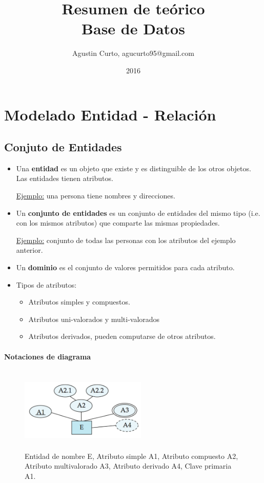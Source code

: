 \documentclass[12pt,a4paper]{report}
\author{Agustin Curto, agucurto95@gmail.com}
\title{Resumen de teórico \\ Base de Datos}
\date{2016}
\begin{document}
\maketitle
\tableofcontents

\chapter{Modelado Entidad - Relación}
	\section{Conjuto de Entidades}
		\begin{itemize}
			\item Una \textbf{entidad} es un objeto que existe y es distinguible de los otros objetos. Las entidades tienen atributos.
			\par \underline{Ejemplo:} una persona tiene nombres y direcciones.
			\item Un \textbf{conjunto de entidades} es un conjunto de entidades del mismo tipo (i.e. con los mismos atributos) que comparte las mismas propiedades.
			\par \underline{Ejemplo:} conjunto de todas las personas con los atributos del ejemplo anterior.
			\item Un \textbf{dominio} es el conjunto de valores permitidos para cada atributo. 
			
			\item Tipos de atributos:
				\begin{itemize}
					\item Atributos simples y compuestos.
					\item Atributos uni-valorados y multi-valorados
					\item Atributos derivados, pueden computarse de otros atributos.
				\end{itemize}
		\end{itemize}
		
		\subsubsection{Notaciones de diagrama}
			\begin{figure}[htb]
				\centering
				\includegraphics[width=6cm, height=4cm]{./imagenes/entidad.png}
				\caption{Entidad de nombre E, Atributo simple A1, Atributo compuesto A2, Atributo multivalorado A3, Atributo derivado A4, Clave primaria A1.}
			\end{figure}
\end{document}

